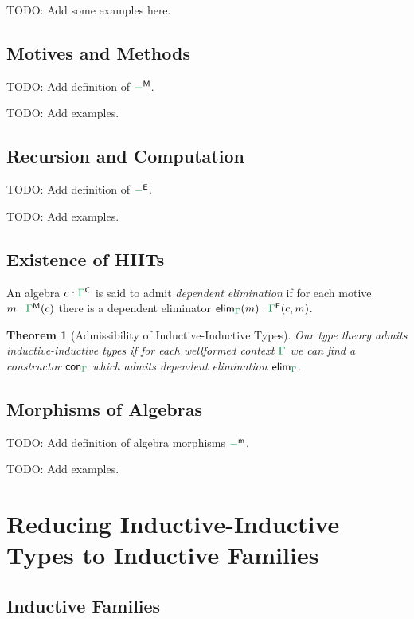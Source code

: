 \documentclass[12pt,headings=optiontohead,openany,oneside,a4paper]{book}
\newtheorem{thm}{Theorem}[section]
\theoremstyle{definition}
\newcommand{\gr}[1]{{\color{ForestGreen}#1}}
\newcommand{\grm}[1]{\ensuremath{\gr{#1}}}
\newcommand{\CC}{\mathsf{C}}
\newcommand{\EE}{\mathsf{E}}
\newcommand{\MM}{\mathsf{M}}
\newcommand{\mm}{\mathsf{m}}
\newcommand{\con}{\mathsf{con}}
\newcommand{\elim}{\mathsf{elim}}
\begin{document}
TODO: Add some examples here.

\section{Motives and Methods}

TODO: Add definition of $\grm{-}^\MM$.

TODO: Add examples.

\section{Recursion and Computation}

TODO: Add definition of $\grm{-}^\EE$.

TODO: Add examples.

\section{Existence of HIITs}

\begin{defn}
An algebra $c : \grm{\Gamma}^\CC$ is said to admit \emph{dependent elimination}
if for each motive $m : \grm{\Gamma}^\MM(c)$ there is a dependent eliminator
$\elim_{\grm{\Gamma}}(m) : \grm{\Gamma}^\EE(c, m)$.
\end{defn}

\begin{thm}[Admissibility of Inductive-Inductive Types]
Our type theory admits inductive-inductive types if for each wellformed context
$\grm{\Gamma}$ we can find a constructor $\con_{\grm{\Gamma}}$ which admits dependent
elimination $\elim_{\grm{\Gamma}}$.
\end{thm}

\section{Morphisms of Algebras}

TODO: Add definition of algebra morphisms $\grm{-}^\mm$.

TODO: Add examples.

\chapter{Reducing Inductive-Inductive Types to Inductive Families}

\section{Inductive Families}
\end{document}
